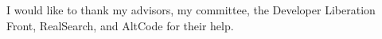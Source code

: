 \begin{acknowledgements}
I would like to thank my advisors, my committee, the Developer Liberation Front, RealSearch, and AltCode for their help.
\end{acknowledgements}


\thesistableofcontents

\thesislistoftables

\thesislistoffigures

